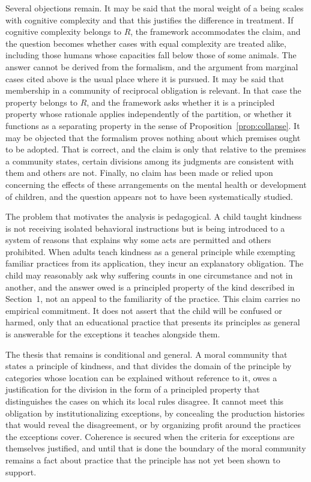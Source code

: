 \documentclass[11pt]{article}
\theoremstyle{definition}
\theoremstyle{plain}
\theoremstyle{definition}
\newcommand{\Rel}{R}
\begin{document}
Several objections remain. It may be said that the moral weight of a being scales with cognitive complexity and that this justifies the difference in treatment. If cognitive complexity belongs to $\Rel$, the framework accommodates the claim, and the question becomes whether cases with equal complexity are treated alike, including those humans whose capacities fall below those of some animals. The answer cannot be derived from the formalism, and the argument from marginal cases cited above is the usual place where it is pursued. It may be said that membership in a community of reciprocal obligation is relevant. In that case the property belongs to $\Rel$, and the framework asks whether it is a principled property whose rationale applies independently of the partition, or whether it functions as a separating property in the sense of Proposition~\ref{prop:collapse}. It may be objected that the formalism proves nothing about which premises ought to be adopted. That is correct, and the claim is only that relative to the premises a community states, certain divisions among its judgments are consistent with them and others are not. Finally, no claim has been made or relied upon concerning the effects of these arrangements on the mental health or development of children, and the question appears not to have been systematically studied.

The problem that motivates the analysis is pedagogical. A child taught kindness is not receiving isolated behavioral instructions but is being introduced to a system of reasons that explains why some acts are permitted and others prohibited. When adults teach kindness as a general principle while exempting familiar practices from its application, they incur an explanatory obligation. The child may reasonably ask why suffering counts in one circumstance and not in another, and the answer owed is a principled property of the kind described in Section~1, not an appeal to the familiarity of the practice. This claim carries no empirical commitment. It does not assert that the child will be confused or harmed, only that an educational practice that presents its principles as general is answerable for the exceptions it teaches alongside them.

The thesis that remains is conditional and general. A moral community that states a principle of kindness, and that divides the domain of the principle by categories whose location can be explained without reference to it, owes a justification for the division in the form of a principled property that distinguishes the cases on which its local rules disagree. It cannot meet this obligation by institutionalizing exceptions, by concealing the production histories that would reveal the disagreement, or by organizing profit around the practices the exceptions cover. Coherence is secured when the criteria for exceptions are themselves justified, and until that is done the boundary of the moral community remains a fact about practice that the principle has not yet been shown to support.
\end{document}
